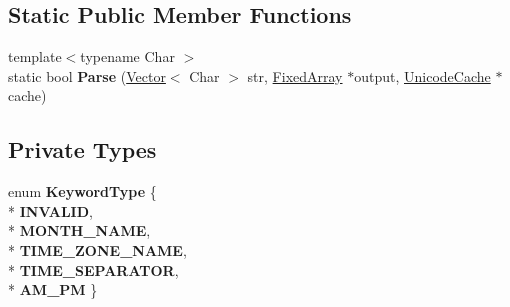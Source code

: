 \subsection*{Static Public Member Functions}
\begin{DoxyCompactItemize}
\item 
{\footnotesize template$<$typename Char $>$ }\\static bool {\bfseries Parse} (\hyperlink{classv8_1_1internal_1_1_vector}{Vector}$<$ Char $>$ str, \hyperlink{classv8_1_1internal_1_1_fixed_array}{Fixed\+Array} $\ast$output, \hyperlink{classv8_1_1internal_1_1_unicode_cache}{Unicode\+Cache} $\ast$cache)\hypertarget{classv8_1_1internal_1_1_date_parser_a326f56b8caa5cffeec10711b1d354e11}{}\label{classv8_1_1internal_1_1_date_parser_a326f56b8caa5cffeec10711b1d354e11}

\end{DoxyCompactItemize}
\subsection*{Private Types}
\begin{DoxyCompactItemize}
\item 
enum {\bfseries Keyword\+Type} \{ \\*
{\bfseries I\+N\+V\+A\+L\+ID}, 
\\*
{\bfseries M\+O\+N\+T\+H\+\_\+\+N\+A\+ME}, 
\\*
{\bfseries T\+I\+M\+E\+\_\+\+Z\+O\+N\+E\+\_\+\+N\+A\+ME}, 
\\*
{\bfseries T\+I\+M\+E\+\_\+\+S\+E\+P\+A\+R\+A\+T\+OR}, 
\\*
{\bfseries A\+M\+\_\+\+PM}
 \}\hypertarget{classv8_1_1internal_1_1_date_parser_ac1d486bfb4b4482246cf4317cfb74c0e}{}\label{classv8_1_1internal_1_1_date_parser_ac1d486bfb4b4482246cf4317cfb74c0e}

\end{DoxyCompactItemize}
